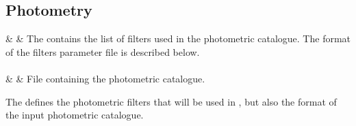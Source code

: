 \documentclass[a4paper,11pt,twoside]{article}
\begin{document}
\subsection{Photometry}\label{sec:paramFile_phot}


\begin{keyword_table}								

	& 	&  The  contains the list of filters used in the photometric catalogue. The format of the filters parameter file is described below. \\

\\[\rowspace]

	& 	&  File containing the photometric catalogue. \\


\end{keyword_table}

The  defines the photometric filters that will be used in \beagle, but also the format of the input photometric catalogue. 
\end{document}
